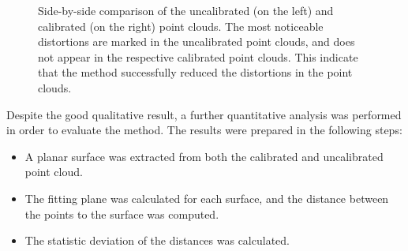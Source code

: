 \documentclass[conference]{IEEEtran}
\begin{document}
\begin{figure}
    \centering
     \qquad

    \caption{Side-by-side comparison of the uncalibrated (on the left) and calibrated (on the right) point clouds. The most noticeable distortions are marked in the uncalibrated point clouds, and does not appear in the respective calibrated point clouds. This indicate that the method successfully reduced the distortions in the point clouds.}
    \label{figure:visual-comparison}
\end{figure}

Despite the good qualitative result, a further quantitative analysis was performed in order to evaluate the method. The results were prepared in the following steps:

\begin{itemize}
    \item A planar surface was extracted from both the calibrated and uncalibrated point cloud.
    \item The fitting plane was calculated for each surface, and the distance between the points to the surface was computed.
    \item The statistic deviation of the distances was calculated.
\end{itemize}
\end{document}
